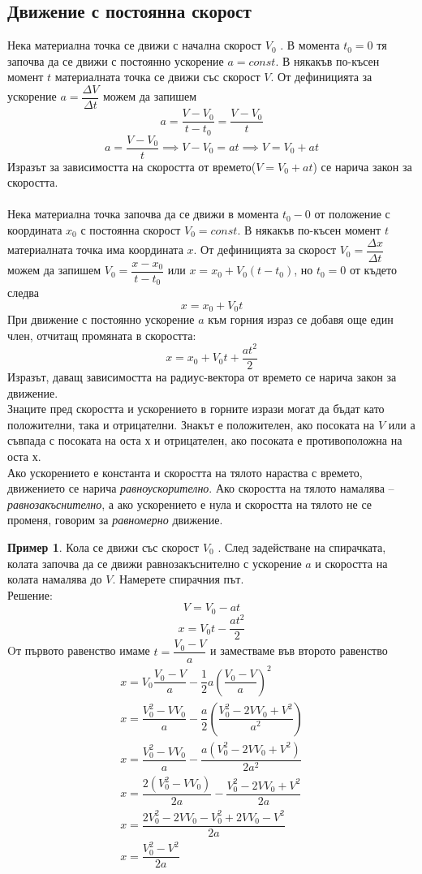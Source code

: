 \documentclass[fleqn, 12pt]{article}
\theoremstyle{definition}
\newtheorem{example}{Пример}[subsection]
\begin{document}
\subsection{Движение с постоянна скорост}
Нека материална точка се движи с начална скорост $V_0$ . В момента $t_0 = 0$ тя започва да се движи с постоянно ускорение $a = const$. В някакъв по-късен момент $t$ материалната точка се движи със скорост $V$. От дефиницията за ускорение  $ a =\dfrac{\Delta V}{\Delta t}$ можем да запишем 
$$a = \dfrac{V - V_0}{t - t_0} = \dfrac{V - V_0}{t}$$
$$a = \dfrac{V - V_0}{t} \implies V - V_0 = at \implies V = V_0 + at$$
Изразът за зависимостта на скоростта от времето($V = V_0 + at$) се нарича закон за скоростта. \\
\\
Нека материална точка започва да се движи в момента $t_0 - 0$ от положение с координата $x_0$ с постоянна скорост  $V_0 = const$. В някакъв по-късен момент $t$ материалната точка има координата $x$. От дефиницията за скорост  $V_0 = \dfrac{\Delta x}{\Delta t}$ можем да запишем $V_0 = \dfrac{x-x_0}{t - t_0}$ или $x = x_0 + V_0(t-t_0)$, но $t_0 = 0$ от където следва 
$$x = x_0 + V_0t$$
При движение с постоянно ускорение $a$ към горния израз се добавя още един член, отчитащ промяната в скоростта: 
$$x = x_0 + V_0t + \dfrac{at^2}{2}$$
Изразът, даващ зависимостта на радиус-вектора от времето се нарича закон за движение. \\
Знаците пред скоростта и ускорението в горните изрази могат да бъдат като положителни, така и отрицателни. Знакът е положителен, ако посоката на $V$ или а съвпада с посоката на оста х и отрицателен, ако посоката е противоположна на оста х.\\
Ако ускорението е константа и скоростта на тялото нараства с времето, движението се нарича \textit{равноускорително}. Ако скоростта на тялото намалява – \textit{равнозакъснително}, а ако ускорението е нула и скоростта на тялото не се променя, говорим за \textit{равномерно} движение.

\begin{example}
Кола се движи със скорост $V_0$ . След задействане на спирачката, колата започва да се движи равнозакъснително с ускорение $a$ и скоростта на колата намалява до $V$. Намерете спирачния път.\\
Решение:
$$V = V_0 - at$$
$$x = V_0t - \dfrac{at^2}{2}$$
Oт първото равенство имаме $t = \dfrac{V_0 - V}{a}$ и заместваме във второто равенство
\begin{gather*}
x = V_0 \dfrac{V_0 - V}{a} - \dfrac{1}{2}a \left( \dfrac{V_0 - V}{a}\right)^2 \\
x = \dfrac{V_0 ^2 - VV_0}{a} -  \dfrac{a}{2}  \left( \dfrac{V_0 ^2 - 2VV_0 + V^2}{a^2}\right)\\ 
x =\dfrac{V_0 ^2 - VV_0}{a} - \dfrac{a(V_0 ^2 - 2VV_0 + V^2)}{2a^2}\\
x = \dfrac{2(V_0 ^2 - VV_0)}{2a} - \dfrac{V_0 ^2 - 2VV_0 + V^2}{2a}\\
x = \dfrac{2V_0 ^2 - 2VV_0 - V_0 ^2 + 2VV_0 - V^2}{2a}\\
x = \dfrac{V_0 ^2 - V^2}{2a}
\end{gather*}
\end{example}
\end{document}
